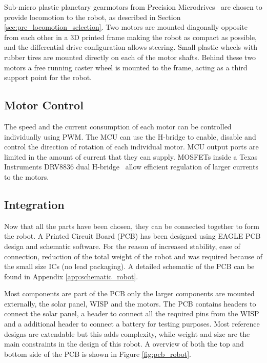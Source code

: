 Sub-micro plastic planetary gearmotors from Precision Microdrives~\cite{gearmotor_206-110_2017} are chosen to provide locomotion to the robot, as described in Section \ref{sec:pre_locomotion_selection}.
Two motors are mounted diagonally opposite from each other in a 3D printed frame making the robot as compact as possible, and the differential drive configuration allows steering.
Small plastic wheels with rubber tires are mounted directly on each of the motor shafts.
Behind these two motors a free running caster wheel is mounted to the frame, acting as a third support point for the robot.

\subsection{Motor Control}
\label{sec:dai_motor_control}

The speed and the current consumption of each motor can be controlled individually using PWM.
The MCU can use the H-bridge to enable, disable and control the direction of rotation of each individual motor.
MCU output ports are limited in the amount of current that they can supply.
MOSFETs inside a Texas Instruments DRV8836 dual H-bridge~\cite{drv8836_2017} allow efficient regulation of larger currents to the motors.

\subsection{Integration}

Now that all the parts have been chosen, they can be connected together to form the robot.
A Printed Circuit Board (PCB) has been designed using EAGLE PCB design and schematic software.
For the reason of increased stability, ease of connection, reduction of the total weight of the robot and was required because of the small size ICs (no lead packaging).
A detailed schematic of the PCB can be found in Appendix \ref{app:schematic_robot}.

Most components are part of the PCB only the larger components are mounted externally, the solar panel, WISP and the motors.
The PCB contains headers to connect the solar panel, a header to connect all the required pins from the WISP and a additional header to connect a battery for testing purposes.
Most reference designs are extendable but this adds complexity, while weight and size are the main constraints in the design of this robot.
A overview of both the top and bottom side of the PCB is shown in Figure \ref{fig:pcb_robot}.

